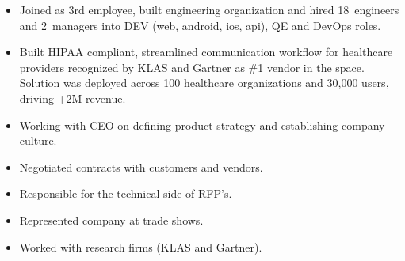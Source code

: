 \documentclass[11pt,a4paper,roman]{moderncv}       %
\begin{document}
{%


\begin{itemize}
    \item Joined as 3rd employee, built engineering organization and hired 18~engineers and 2~managers into DEV (web, android, ios, api), QE and DevOps roles. 
    \item Built HIPAA compliant, streamlined communication workflow for healthcare providers recognized by KLAS and Gartner as \#1 vendor in the space. Solution was deployed across 100 healthcare organizations and 30,000 users, driving +2M revenue.
    \item Working with CEO on defining product strategy and establishing company culture.
    \item Negotiated contracts with customers and vendors.
    \item Responsible for the technical side of RFP's.
    \item Represented company at trade shows.
    \item Worked with research firms (KLAS and Gartner).
\end{itemize}

\bigskip


}
\end{document}
